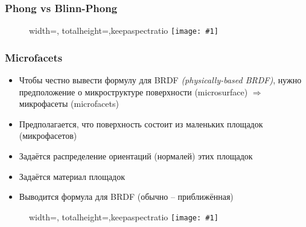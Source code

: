 \documentclass{beamer}
\newcommand{\slideimage}[1]{
  \begin{figure}
    \begin{adjustbox}{width=\textwidth, totalheight=\textheight-2\baselineskip-2\baselineskip,keepaspectratio}
      \texttt{[image: \#1]}
    \end{adjustbox}
  \end{figure}
}
\begin{document}
\begin{frame}[fragile]
\frametitle{Phong vs Blinn-Phong}
\slideimage{blinn-phong.png}
\end{frame}

\begin{frame}[fragile]
\frametitle{Microfacets}
\begin{itemize}
\item Чтобы честно вывести формулу для BRDF \textit{(physically-based BRDF)}, нужно предположение о микроструктуре поверхности (microsurface) \pause \begin{math}\Rightarrow\end{math} микрофасеты (microfacets)
\item Предполагается, что поверхность состоит из маленьких площадок (микрофасетов)
\pause
\item Задаётся распределение ориентаций (нормалей) этих площадок
\pause
\item Задаётся материал площадок
\pause
\item Выводится формула для BRDF (обычно -- приближённая)
\end{itemize}
\slideimage{microfacet.png}
\end{frame}
\end{document}
